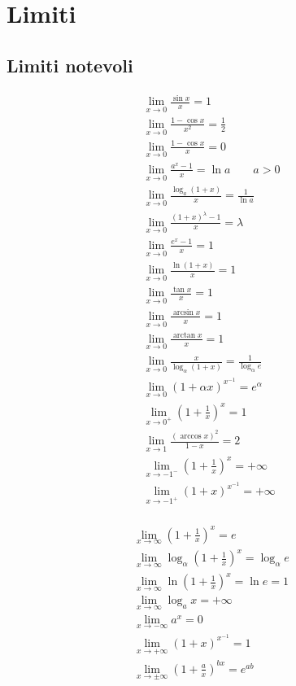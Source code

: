 
\chapter{Limiti} %

\label{ch:limiti-a} %

\section{Limiti notevoli}
\begin{gather}
\lim_{x\to0}{\frac{\sin x}{x}}=1 \\
\lim_{x\to0}{\frac{1-\cos x}{x^2}}=\frac{1}{2} \\
\lim_{x\to0}{\frac{1-\cos x}{x}}=0 \\
\lim_{x\to0}{\frac{a^x-1}{x}} = \ln a \qquad a>0 \\
\lim_{x\to0}{\frac{\log_a(1+x)}{x}}=\frac{1}{\ln a} \\
\lim_{x\to0}{\frac{(1+x)^\lambda-1}{x}}=\lambda \\
\lim_{x\to0}{\frac{e^x-1}{x}}=1 \\
\lim_{x\to0}{\frac{\ln(1+x)}{x}}=1 \\
\lim_{x\to0}{\frac{\tan x}{x}}=1 \\
\lim_{x\to0}{\frac{\arcsin x}{x}}=1 \\
\lim_{x\to0}{\frac{\arctan x}{x}}=1 \\
\lim_{x\to0}{\frac{x}{\log_\alpha(1+x)}}=\frac{1}{\log_\alpha e} \\
\lim_{x\to0}{(1+\alpha x)^{x^{-1}}}=e^\alpha \\
\lim_{x\to0^+}{\left(1+\frac{1}{x}\right)^x}=1 \\
\lim_{x\to1}{\frac{(\arccos x)^2}{1-x}}=2 \\
\lim_{x\to-1^-}{\left(1+\frac{1}{x}\right)^x}=+\infty \\
\lim_{x\to-1^+}{(1+x)^{x^{-1}}}=+\infty \\
\end{gather}

\begin{gather}
\lim_{x\to\infty}{\left(1+\frac{1}{x}\right)^x}=e \\
\lim_{x\to\infty}{\log_\alpha \left(1+\frac{1}{x}\right)^x}=\log_\alpha e \\
\lim_{x\to\infty}{\ln\left(1+\frac{1}{x}\right)^x}=\ln e=1 \\
\lim_{x\to\infty}{\log_a x}=+\infty \\
\lim_{x\to-\infty}{a^x}=0 \\
\lim_{x\to+\infty}{(1+x)^{x^{-1}}}=1 \\
\lim_{x\to\pm\infty}{\left(1+\frac{a}{x}\right)^{bx}}=e^{ab} \\
\end{gather}

